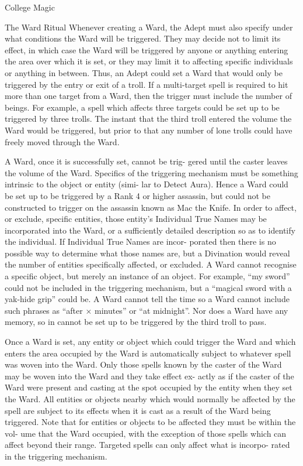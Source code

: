 \begin{Chapter}{College Magic}
\begin{ritual}{The Ward Ritual}
Whenever  creating  a  Ward,  the  Adept  must  also 
specify  under  what  conditions  the  Ward  will  be 
triggered.  They  may  decide  not  to  limit  its  effect, 
in which case the Ward will be triggered by anyone 
or anything entering the area over which it is set, or 
they may limit it to affecting specific individuals or 
anything  in  between.  Thus,  an  Adept  could  set  a 
Ward that would only be triggered by the entry or 
exit  of  a  troll.  If  a  multi-target  spell  is  required  to 
hit  more  than  one  target  from  a  Ward,  then  the 
trigger  must  include  the  number  of  beings.  For 
example,  a  spell  which  affects  three  targets  could 
be set up to be triggered by three trolls. The instant 
that  the  third  troll  entered  the  volume  the  Ward 
would be triggered, but prior to that any number of 
lone  trolls  could  have  freely  moved  through  the 
Ward. 

A Ward, once it is successfully set, cannot be trig-
gered  until  the  caster  leaves  the  volume  of  the 
Ward.  Specifics  of  the  triggering  mechanism must 
be something intrinsic to the object or entity (simi-
lar to Detect Aura). Hence a Ward could be set up 
to be triggered by a Rank 4 or higher assassin, but 
could not be  constructed to  trigger  on  the  assassin 
known  as  Mac  the  Knife.  In  order  to  affect,  or 
exclude,  specific  entities,  those  entity’s  Individual 
True Names may be incorporated into the Ward, or 
a  sufficiently  detailed  description  so  as  to  identify 
the individual. If Individual True Names are incor-
porated then there is no possible way to determine 
what  those  names  are,  but  a  Divination  would 
reveal  the  number  of  entities  specifically  affected, 
or  excluded.  A  Ward  cannot  recognise  a  specific 
object,  but  merely  an  instance  of  an  object.  For 
example, “my sword” could not be included in the 
triggering mechanism, but a “magical sword with a 
yak-hide  grip”  could  be.  A  Ward  cannot  tell  the 
time  so  a  Ward  cannot  include  such  phrases  as 
“after  ×  minutes”  or  “at  midnight”.  Nor  does  a 
Ward have any memory, so in cannot be set up to 
be triggered by the third troll to pass. 

Once  a  Ward  is  set,  any  entity  or  object  which 
could  trigger  the  Ward  and  which  enters  the  area 
occupied  by  the  Ward  is  automatically  subject  to 
whatever  spell  was  woven  into  the  Ward.  Only 
those spells known by the caster of the Ward may 
be  woven  into  the  Ward  and  they  take  effect  ex-
actly as if the caster of the Ward were present and 
casting  at  the  spot  occupied  by  the  entity  when 
they  set  the  Ward.  All  entities  or  objects  nearby 
which would normally be affected by the spell are 
subject  to  its  effects  when  it  is  cast  as  a  result  of 
the Ward  being  triggered.  Note  that for  entities  or 
objects to be affected they must be within the vol-
ume that the Ward occupied, with the exception of 
those  spells  which  can  affect  beyond  their  range. 
Targeted  spells  can  only  affect  what  is  incorpo-
rated in the triggering mechanism. 


\end{ritual}
\end{Chapter}
